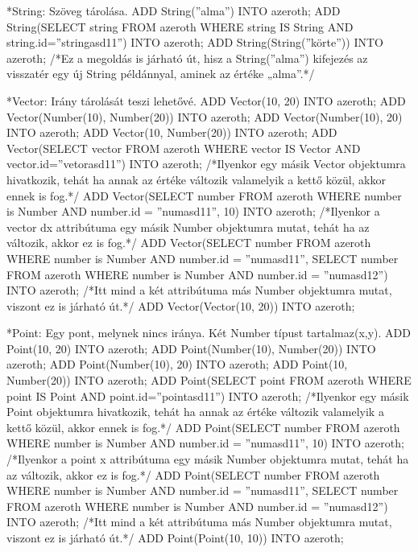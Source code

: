 *String: Szöveg tárolása.
ADD String(”alma”) INTO azeroth;
ADD String(SELECT string FROM azeroth WHERE string IS String AND string.id=”stringasd11”) INTO azeroth;
ADD String(String(”körte”)) INTO azeroth; /*Ez a megoldás is járható út, hisz a String(”alma”) kifejezés az visszatér egy új String példánnyal, aminek az értéke „alma”.*/

*Vector: Irány tárolását teszi lehetővé.
ADD Vector(10, 20) INTO azeroth;
ADD Vector(Number(10), Number(20)) INTO azeroth;
ADD Vector(Number(10), 20) INTO azeroth;
ADD Vector(10, Number(20)) INTO azeroth;
ADD Vector(SELECT vector FROM azeroth WHERE vector IS Vector AND vector.id=”vetorasd11”) INTO azeroth; /*Ilyenkor egy másik Vector objektumra hivatkozik, tehát ha annak az értéke változik valamelyik a kettő közül, akkor ennek is fog.*/
ADD Vector(SELECT number FROM azeroth WHERE number is Number AND number.id = ”numasd11”, 10) INTO azeroth; /*Ilyenkor a vector dx attribútuma egy másik Number objektumra mutat, tehát ha az változik, akkor ez is fog.*/
ADD Vector(SELECT number FROM azeroth WHERE number is Number AND number.id = ”numasd11”, SELECT number FROM azeroth WHERE number is Number AND number.id = ”numasd12”) INTO azeroth;  /*Itt mind a két attribútuma más Number objektumra mutat, viszont ez is járható út.*/
ADD Vector(Vector(10, 20)) INTO azeroth;


*Point: Egy pont, melynek nincs iránya. Két Number típust tartalmaz(x,y).
ADD Point(10, 20) INTO azeroth;
ADD Point(Number(10), Number(20)) INTO azeroth;
ADD Point(Number(10), 20) INTO azeroth;
ADD Point(10, Number(20)) INTO azeroth;
ADD Point(SELECT point FROM azeroth WHERE point IS Point AND point.id=”pointasd11”) INTO azeroth; /*Ilyenkor egy másik Point objektumra hivatkozik, tehát ha annak az értéke változik valamelyik a kettő közül, akkor ennek is fog.*/
ADD Point(SELECT number FROM azeroth WHERE number is Number AND number.id = ”numasd11”, 10) INTO azeroth; /*Ilyenkor a point x attribútuma egy másik Number objektumra mutat, tehát ha az változik, akkor ez is fog.*/
ADD Point(SELECT number FROM azeroth WHERE number is Number AND number.id = ”numasd11”, SELECT number FROM azeroth WHERE number is Number AND number.id = ”numasd12”) INTO azeroth;  /*Itt mind a két attribútuma más Number objektumra mutat, viszont ez is járható út.*/
ADD Point(Point(10, 10)) INTO azeroth;


